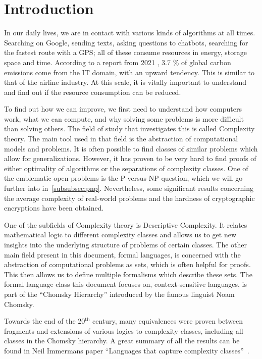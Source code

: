 \chapter{Introduction}\label{ch:intro}

In our daily lives, we are in contact with various kinds of algorithms at all times.
Searching on Google, sending texts, asking questions to chatbots, searching for the fastest route with a GPS; all of these consume resources in energy, storage space and time.
According to a report from 2021 \cite{webFootprint}, 3.7 \% of global carbon emissions come from the IT domain, with an upward tendency.
This is similar to that of the airline industry.
At this scale, it is vitally important to understand and find out if the resource consumption can be reduced.

To find out how we can improve, we first need to understand how computers work, what we can compute, and why solving some problems is more difficult than solving others.
The field of study that investigates this is called Complexity theory.
The main tool used in that field is the abstraction of computational models and problems.
It is often possible to find classes of similar problems which allow for generalizations.
However, it has proven to be very hard to find proofs of either optimality of algorithms or the separations of complexity classes.
One of the emblematic open problems is the P versus NP question, which we will go further into in~\cref{subsubsec:pnp}.
Nevertheless, some significant results concerning the average complexity of real-world problems and the hardness of cryptographic encryptions have been obtained.

One of the subfields of Complexity theory is Descriptive Complexity.
It relates mathematical logic to different complexity classes and allows us to get new insights into the underlying structure of problems of certain classes.
The other main field present in this document, formal languages, is concerned with the abstraction of computational problems as sets, which is often helpful for proofs.
This then allows us to define multiple formalisms which describe these sets.
The formal language class this document focuses on, context-sensitive languages, is part of the ``Chomsky Hierarchy'' introduced by the famous linguist Noam Chomsky.

Towards the end of the 20$^{\text{th}}$ century, many equivalences were proven between fragments and extensions of various logics to complexity classes, including all classes in the Chomsky hierarchy.
A great summary of all the results can be found in Neil Immermans paper ``Languages that capture complexity classes''~\cite{Immerman1987}.

